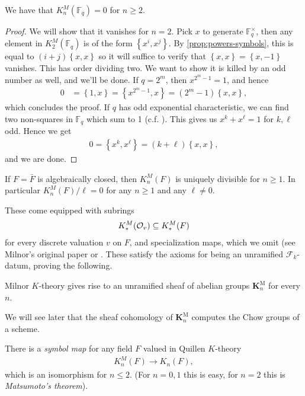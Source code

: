 \documentclass[11pt,openany]{book}
\providecommand{\KM}{\mathbf{K}^\mathrm{M}}
\begin{document}
%
\begin{example} \cite[III.6.1,~III.7.2]{Kbook}
We have that $K_n^M(\mathbb{F}_q) =0$ for $n\ge 2$.
\end{example}
\begin{proof} We will show that it vanishes for $n=2$. Pick $x$ to generate $\mathbb{F}_q^\times$, then any element in $K_2^M(\mathbb{F}_q)$ is of the form $\left\{ x^i,x^j \right\}$. By \autoref{prop:powers-symbols}, this is equal to $(i+j) \left\{ x,x \right\}$ so it will suffice to verify that $\left\{ x,x \right\} = \left\{ x,-1 \right\}$ vanishes. This has order dividing two. We want to show it is killed by an odd number as well, and we'll be done. If $q = 2^m$, then $x^{2^m-1}=1$, and hence
\begin{align*}
    0 &= \left\{ 1,x \right\} = \left\{ x^{2^m-1},x \right\} = \left( 2^m-1 \right)\left\{ x,x \right\},
\end{align*}
which concludes the proof. If $q$ has odd exponential characteristic, we can find two non-squares in $\mathbb{F}_q$ which sum to 1 (c.f. \cite[1.3.6]{GS}). This gives us $x^k + x^\ell = 1$ for $k,\ell$ odd. Hence we get
\begin{align*}
    0 = \left\{ x^k,x^\ell \right\} = (k+ \ell) \left\{ x,x \right\},
\end{align*}
and we are done.
\end{proof}


\begin{example} \cite[III.7.2]{Kbook}
If $F = \bar{F}$ is algebraically closed, then $K_n^M(F)$ is uniquely divisible for $n\ge1$. In particular $K_n^M(F)/\ell = 0$ for any $n\ge 1$ and any $\ell\ne 0$.
\end{example}

%
These come equipped with subrings
\begin{align*}
    K^M_\ast(\mathcal{O}_v) \subseteq K^M_\ast(F)
\end{align*}
for every discrete valuation $v$ on $F$, and specialization maps, which we omit (see Milnor's original paper or \cite[7.3]{Kbook}. These satisfy the axioms for being an unramified $\mathcal{F}_k$-datum, proving the following.
\begin{proposition} Milnor $K$-theory gives rise to an unramified sheaf of abelian groups $\KM_n$ for every $n$.
\end{proposition}

We will see later that the sheaf cohomology of $\KM_n$ computes the Chow groups of a scheme.

\begin{proposition}\label{prop:symbol_map} There is a \textit{symbol map} for any field $F$ valued in Quillen $K$-theory
\begin{align*}
    K_n^M(F) \to K_n(F),
\end{align*}
which is an isomorphism for $n\le 2$. (For $n=0,1$ this is easy, for $n=2$ this is \textit{Matsumoto's theorem}).
\end{proposition}
\end{document}
